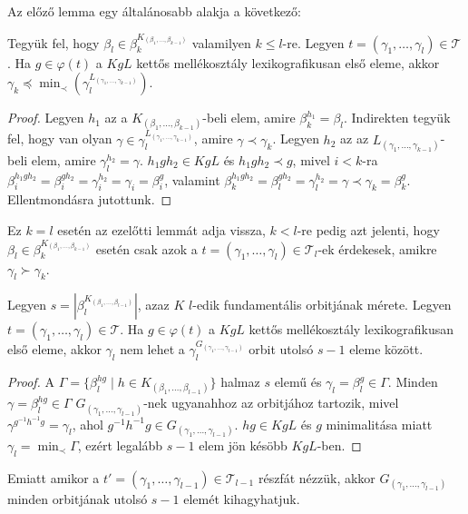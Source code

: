 Az előző lemma egy általánosabb alakja a következő:
\begin{lemma}
\label{thm:permbtcrit3}
Tegyük fel, hogy $\beta_l \in \beta_k^{K_{(\beta_1,\dots,\beta_{k-1})}}$ valamilyen $k \le l$-re.
Legyen $t = (\gamma_1, \dots, \gamma_l) \in \mathcal{T}$.
Ha $g \in \varphi(t)$ a $KgL$ kettős mellékosztály lexikografikusan első eleme, akkor $\gamma_k \preceq \min_{\prec}(\gamma_l^{L_{(\gamma_1,\dots,\gamma_{k-1})}})$.
\end{lemma}
\begin{proof}
Legyen $h_1$ az a $K_{(\beta_1,\dots,\beta_{k-1})}$-beli elem, amire $\beta_k^{h_1} = \beta_l$.
Indirekten tegyük fel, hogy van olyan $\gamma \in \gamma_l^{L_{(\gamma_1,\dots,\gamma_{k-1})}}$, amire $\gamma \prec \gamma_k$.
Legyen $h_2$ az az $L_{(\gamma_1,\dots,\gamma_{k-1})}$-beli elem, amire $\gamma_l^{h_2} = \gamma$.
$h_1gh_2 \in KgL$ és $h_1gh_2 \prec g$, mivel $i < k$-ra $\beta_i^{h_1gh_2} = \beta_i^{gh_2} = \gamma_i^{h_2} = \gamma_i = \beta_i^g$,
valamint $\beta_k^{h_1gh_2} = \beta_l^{gh_2} = \gamma_l^{h_2} = \gamma \prec \gamma_k = \beta_k^g$.
Ellentmondásra jutottunk.
\end{proof}
Ez $k=l$ esetén az ezelőtti lemmát adja vissza, $k < l$-re pedig azt jelenti, hogy $\beta_l \in \beta_k^{K_{(\beta_1,\dots,\beta_{k-1})}}$ esetén csak azok a $t = (\gamma_1, \dots, \gamma_l) \in \mathcal{T}_l$-ek
érdekesek, amikre $\gamma_l \succ \gamma_k$.

\begin{lemma}
\label{thm:permbtcrit4}
Legyen $s = |\beta_l^{K_{(\beta_1,\dots,\beta_{l-1})}}|$, azaz $K$ $l$-edik fundamentális orbitjának mérete.
Legyen $t = (\gamma_1, \dots, \gamma_l) \in \mathcal{T}$.
Ha $g \in \varphi(t)$ a $KgL$ kettős mellékosztály lexikografikusan első eleme, akkor $\gamma_l$ nem lehet a $\gamma_l^{G_{(\gamma_1,\dots,\gamma_{l-1})}}$ orbit utolsó $s-1$ eleme között.
\end{lemma}
\begin{proof}
A $\Gamma = \{ \beta_l^{hg} \mid h \in K_{(\beta_1,\dots,\beta_{l-1})} \}$ halmaz $s$ elemű és $\gamma_l = \beta_l^g \in \Gamma$.
Minden $\gamma = \beta_l^{hg} \in \Gamma$ $G_{(\gamma_1,\dots,\gamma_{l-1})}$-nek ugyanahhoz az orbitjához tartozik, mivel $\gamma^{g^{-1}h^{-1}g} = \gamma_l$, ahol $g^{-1}h^{-1}g \in G_{(\gamma_1,\dots,\gamma_{l-1})}$.
$hg \in KgL$ és $g$ minimalitása miatt $\gamma_l = \min_{\prec} \Gamma$, ezért legalább $s-1$ elem jön késöbb $KgL$-ben.
\end{proof}
Emiatt amikor a $t' = (\gamma_1, \dots, \gamma_{l-1}) \in \mathcal{T}_{l-1}$ részfát nézzük, akkor $G_{(\gamma_1,\dots,\gamma_{l-1})}$ minden orbitjának utolsó $s-1$ elemét kihagyhatjuk.

